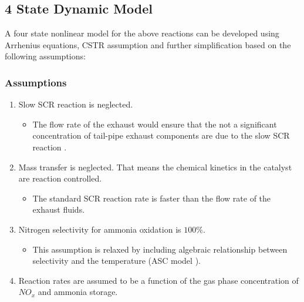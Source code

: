 \subsection{4 State Dynamic Model}
A four state nonlinear model for the above reactions can be developed using
Arrhenius equations, CSTR assumption and further simplification based on the
following assumptions:

\subsubsection{Assumptions}
\begin{enumerate}
    \item Slow SCR reaction is neglected.
    \begin{itemize}
        \item The flow rate of the exhaust would ensure that the not a significant concentration of tail-pipe exhaust components are due to the slow SCR reaction \cite{nova2014urea}.
    \end{itemize}

    \item Mass transfer is neglected. That means the chemical kinetics in the catalyst are reaction controlled.
    \begin{itemize}
        \item The standard SCR reaction rate is faster than the flow rate of the exhaust fluids.
    \end{itemize}

    \item Nitrogen selectivity for ammonia oxidation is $100\%$.
    \begin{itemize}
        \item This assumption is relaxed by including algebraic relationship between selectivity and the temperature (ASC model \cite{jain2023diagnostics}).
    \end{itemize}

    \item Reaction rates are assumed to be a function of the gas phase concentration of $NO_x$ and ammonia storage.
\end{enumerate}



